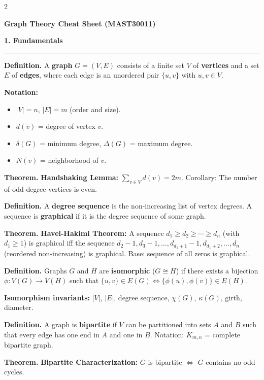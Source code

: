 \documentclass[8pt,landscape,a4paper]{extarticle}
\newcommand{\thm}[1]{\begin{mdframed}[style=theorembox]\textbf{Theorem.} #1\end{mdframed}}
\newcommand{\defn}[1]{\begin{mdframed}[style=defbox]\textbf{Definition.} #1\end{mdframed}}
\newcommand{\heading}[1]{\vspace{1pt}\noindent\textbf{\large #1}\vspace{1pt}\hrule\vspace{2pt}}
\begin{document}
\begin{multicols}{2}

\begin{center}
\textbf{\LARGE Graph Theory Cheat Sheet (MAST30011)}
\end{center}

\heading{1. Fundamentals}

\defn{A \textbf{graph} $G = (V,E)$ consists of a finite set $V$ of \textbf{vertices} and a set $E$ of \textbf{edges}, where each edge is an unordered pair $\{u,v\}$ with $u,v \in V$.}

\textbf{Notation:}
\begin{itemize}[nosep]
    \item $|V| = n$, $|E| = m$ (order and size).
    \item $d(v)$ = degree of vertex $v$.
    \item $\delta(G)$ = minimum degree, $\Delta(G)$ = maximum degree.
    \item $N(v)$ = neighborhood of $v$.
\end{itemize}

\thm{\textbf{Handshaking Lemma:} $\sum_{v \in V} d(v) = 2m$. Corollary: The number of odd-degree vertices is even.}

\defn{A \textbf{degree sequence} is the non-increasing list of vertex degrees. A sequence is \textbf{graphical} if it is the degree sequence of some graph.}

\thm{\textbf{Havel-Hakimi Theorem:} A sequence $d_1 \geq d_2 \geq \cdots \geq d_n$ (with $d_1 \geq 1$) is graphical iff the sequence $d_2 - 1, d_3 - 1, \ldots, d_{d_1+1} - 1, d_{d_1+2}, \ldots, d_n$ (reordered non-increasing) is graphical. Base: sequence of all zeros is graphical.}

\defn{Graphs $G$ and $H$ are \textbf{isomorphic} ($G \cong H$) if there exists a bijection $\phi: V(G) \to V(H)$ such that $\{u,v\} \in E(G) \iff \{\phi(u),\phi(v)\} \in E(H)$.}

\textbf{Isomorphism invariants:} $|V|$, $|E|$, degree sequence, $\chi(G)$, $\kappa(G)$, girth, diameter.

\defn{A graph is \textbf{bipartite} if $V$ can be partitioned into sets $A$ and $B$ such that every edge has one end in $A$ and one in $B$. Notation: $K_{m,n}$ = complete bipartite graph.}

\thm{\textbf{Bipartite Characterization:} $G$ is bipartite $\iff$ $G$ contains no odd cycles.}


\end{multicols}
\end{document}
